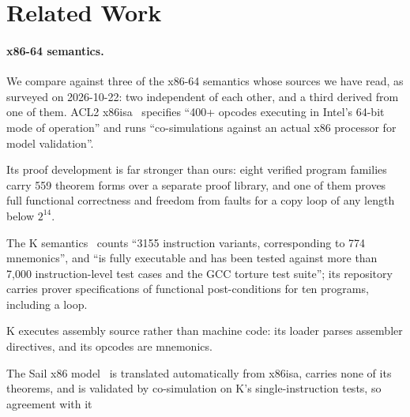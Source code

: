 \documentclass[runningheads]{llncs}
\newcommand{\src}[1]{}  %
\begin{document}
\section{Related Work}
\label{sec:related}

\paragraph{x86-64 semantics.}
We compare against three of the x86-64 semantics whose sources we have read, as surveyed on 2026-10-22: two
independent of each other, and a third derived from one of them.
ACL2 x86isa~\cite{goel-x86isa,x86isa-repo} specifies ``400+ opcodes executing in Intel's 64-bit mode of
operation'' and runs ``co-simulations against an actual x86 processor for model validation''.
\src{docs/CLAIMS.tsv[x86isa\_opcodes]; docs/TACAS-G1-POSITIONING.md 1b, verbatim from arXiv 1705.01225, both phrases in its section 1
(re-read at the PDF 2026-09-15, D249), published as EPTCS 249}
Its proof development is far stronger than ours: eight verified program families carry 559 theorem
forms over a separate proof library, and one of them proves full functional correctness and freedom
from faults for a copy loop of any length below $2^{14}$.
\src{docs/CLAIMS.tsv[x86isa\_theorem\_forms, x86isa\_program\_families]; docs/TACAS-G1-POSITIONING.md 1c.2: dataCopy/dataCopy.lisp copyData-is-correct, whose preconditions carry (unsigned-byte-p 14 n); 559 excludes the
603 forms of the utilities library}
The K semantics~\cite{dasgupta-k-x86,k-x86-repo} counts ``3155 instruction variants, corresponding to
774 mnemonics'', and ``is fully executable and has been tested against more than 7,000
instruction-level test cases and the GCC torture test suite''; its repository carries prover specifications of functional
post-conditions for ten programs, including a loop.
\src{docs/CLAIMS.tsv[k\_variants, k\_mnemonics, k\_tests]; docs/TACAS-G1-POSITIONING.md 1b verbatim from K's README; 1c.4 for the kprove specifications}
K executes assembly source rather than machine code: its loader parses assembler directives, and its
opcodes are mnemonics.
\src{docs/TACAS-G1-POSITIONING.md 1c.8}
The Sail x86 model~\cite{sail-x86-repo} is translated automatically from x86isa, carries none of its
theorems, and is validated by co-simulation on K's single-instruction tests, so agreement with it
\end{document}
